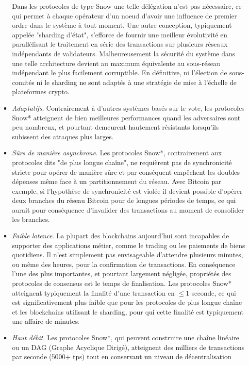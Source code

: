 \documentclass[runningheads]{llncs}
\begin{document}
\begin{itemize}
Dans les protocoles de type Snow une telle délégation n'est pas nécessaire, ce qui permet à chaque opérateur d'un noeud
d'avoir une influence de premier ordre dans le système à tout moment. Une autre conception, typiquement appelée
"sharding d'état", s'efforce de fournir une meilleur évolutivité en parallélisant le traitement en série des transactions
sur plusieurs réseaux indépendants de validateurs. Malheureusement la sécurité du système dans une telle architecture
devient au maximum équivalente au sous-réseau indépendant le plus facilement corruptible. En définitive, ni l'élection
de sous-comités ni le sharding ne sont adaptés à une stratégie de mise à l'échelle de plateformes crypto.
\item \textit{Adaptatifs}. Contrairement à d'autres systèmes basés sur le vote, les protocoles Snow* atteignent de bien
meilleures performances quand les adversaires sont peu nombreux, et pourtant demeurent hautement résistants lorsqu'ils
subissent des attaques plus larges.
\item \textit{Sûrs de manière asynchrone}. Les protocoles Snow*, contrairement aux protocoles dits "de plus longue
chaîne", ne requièrent pas de synchronicité stricte pour opérer de manière sûre et par conséquent empêchent les doubles
dépenses même face à un partitionnement du réseau. Avec Bitcoin par exemple, si l'hypothèse de synchronicité est violée
il devient possible d'opérer deux branches du réseau Bitcoin pour de longues périodes de temps, ce qui aurait pour
conséquence d'invalider des transactions au moment de consolider les branches.
\item \textit{Faible latence}. La plupart des blockchains aujourd'hui sont incapables de supporter des applications
métier, comme le trading ou les paiements de biens quotidiens. Il n'est simplement pas envisageable d'attendre plusieurs
minutes, ou même des heures, pour la confirmation de transactions. En conséquence l'une des plus importantes, et pourtant
largement négligée, propriétés des protocoles de consensus est le temps de finalisation. Les protocoles Snow* atteignent
typiquement la finalité d'une transaction en $\leq 1$ seconde, ce qui est significativement plus faible que pour les
protocoles de plus longue chaîne et les blockchains utilisant le sharding, pour qui cette finalité est typiquement une
affaire de minutes.
\item \textit{Haut débit}. Les protocoles Snow*, qui peuvent construire une chaîne linéaire ou un DAG (Graphe Acyclique
Dirigé), atteignent des milliers de transactions par seconde (5000+ tps) tout en conservant un niveau de décentralisation

\end{itemize}
\end{document}

